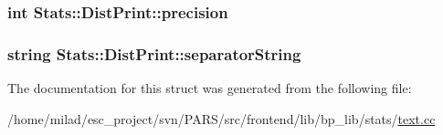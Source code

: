 \label{structStats_1_1DistPrint_a8effa42b5694542dac7f6fb7f1df4230}
\hypertarget{structStats_1_1DistPrint_ac1229f4102622ff8182e625410a7dfc5}{
\subsubsection[{precision}]{\setlength{\rightskip}{0pt plus 5cm}int {\bf Stats::DistPrint::precision}}}
\label{structStats_1_1DistPrint_ac1229f4102622ff8182e625410a7dfc5}
\hypertarget{structStats_1_1DistPrint_a9efef83fe3bbe8076c1b902e00204ca7}{
\subsubsection[{separatorString}]{\setlength{\rightskip}{0pt plus 5cm}string {\bf Stats::DistPrint::separatorString}}}
\label{structStats_1_1DistPrint_a9efef83fe3bbe8076c1b902e00204ca7}


The documentation for this struct was generated from the following file:\begin{DoxyCompactItemize}
\item 
/home/milad/esc\_\-project/svn/PARS/src/frontend/lib/bp\_\-lib/stats/\hyperlink{text_8cc}{text.cc}\end{DoxyCompactItemize}
